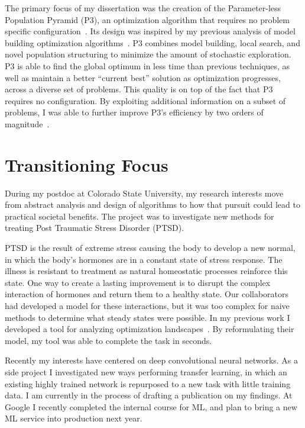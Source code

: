\documentclass[a4paper, 11pt]{article}
\begin{document}
The primary focus of my dissertation was the creation of the
Parameter-less Population Pyramid (P3), an optimization algorithm
that requires no problem specific configuration~\cite{goldman:2014:p3,goldman:2015:fastp3,goldman:2016:p3hiff}.
Its design was inspired by my previous analysis of model building optimization algorithms~\cite{goldman:2012:ltga}.
P3 combines model building, local search, and novel population structuring to minimize the amount
of stochastic exploration.
P3 is able to find the global optimum in less time than previous techniques, as well as
maintain a better ``current best'' solution as optimization progresses, across a diverse set of problems.
This quality is on top
of the fact that P3 requires no configuration.
By exploiting additional information on a subset of problems, I was able to further
improve P3's efficiency by two orders of magnitude~\cite{goldman:2015:GBO}.

\section{Transitioning Focus}
During my postdoc at Colorado State University, my research interests move from abstract analysis
and design of algorithms to how that pursuit could lead to practical societal benefits.
The project was to investigate new methods for treating Post Traumatic Stress Disorder (PTSD).

PTSD is the result of extreme stress causing the body to develop a new
normal, in which the body's hormones are in a constant state of stress response. The illness is resistant
to treatment as natural homeostatic processes reinforce this state. One way to create a lasting improvement
is to disrupt the complex interaction of hormones and return them to a healthy state. Our collaborators
had developed a model for these interactions, but it was too complex for naive methods to determine what
steady states were possible. In my previous work I developed a tool for analyzing optimization
landscapes~\cite{goldman:2016:hyperplane}. By reformulating their model, my tool was able to complete
the task in seconds.

Recently my interests have centered on deep convolutional neural networks. As a side project I
investigated new ways performing transfer learning, in which an existing highly trained network is
repurposed to a new task with little training data. I am currently in the
process of drafting a publication on my findings. At Google I recently completed the internal course
for ML, and plan to bring a new ML service into production next year.
\end{document}

